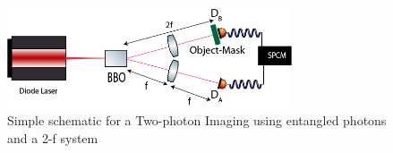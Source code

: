 \begin{figure}[h]
\centering
\includegraphics[width=0.75\textwidth]{Figures/simpleTwo.png}
\caption{Simple schematic for a Two-photon Imaging using entangled photons and a 2-f system} 
\label{fig:2f}
\end{figure}

